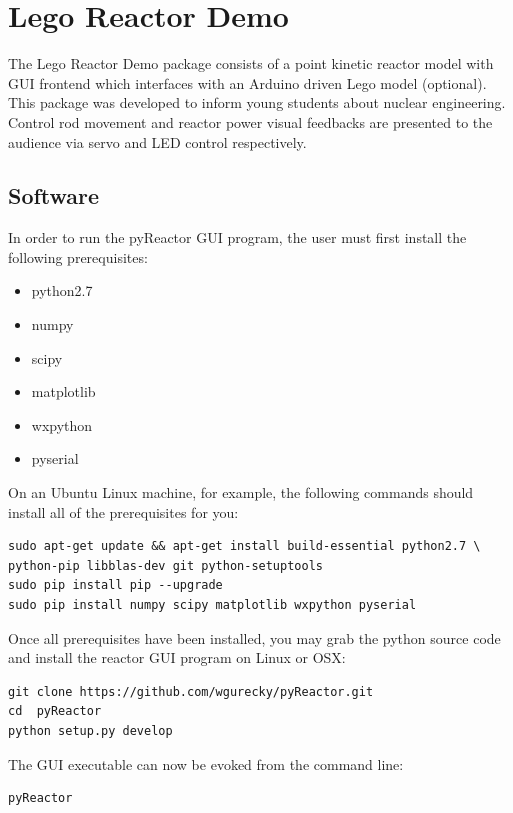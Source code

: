 \documentclass[8pt]{article}
\begin{document}
\section{Lego Reactor Demo}

The Lego Reactor Demo package consists of a point kinetic reactor model with GUI frontend which interfaces with an Arduino driven Lego model (optional).  This package was developed to inform young students about nuclear engineering. Control rod movement and reactor power visual feedbacks are presented to the audience via servo and LED control respectively.

\subsection{Software}

In order to run the pyReactor GUI program, the user must first install the following prerequisites:

\begin{itemize} \itemsep0em
\item python2.7
\item numpy
\item scipy
\item matplotlib
\item wxpython
\item pyserial
\end{itemize}

On an Ubuntu Linux machine, for example, the following commands should install all of the prerequisites for you:

\begin{lstlisting}
sudo apt-get update && apt-get install build-essential python2.7 \
python-pip libblas-dev git python-setuptools
sudo pip install pip --upgrade
sudo pip install numpy scipy matplotlib wxpython pyserial
\end{lstlisting}

Once all prerequisites have been installed, you may grab the python source code and install the reactor GUI program on Linux or OSX:

\begin{lstlisting}
git clone https://github.com/wgurecky/pyReactor.git
cd  pyReactor
python setup.py develop
\end{lstlisting}

The GUI executable can now be evoked from the command line:
\begin{lstlisting}
pyReactor
\end{lstlisting}
\end{document}
